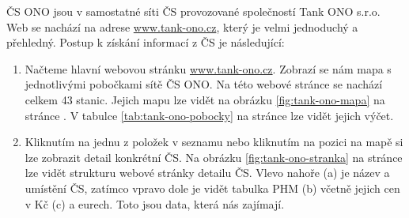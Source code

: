 ČS ONO jsou v samostatné síti ČS provozované společností Tank ONO s.r.o.
Web se nachází na adrese \url{www.tank-ono.cz}, který je velmi jednoduchý
a přehledný. Postup k získání informací z ČS je následující:

\begin{enumerate}
    \item Načteme hlavní webovou stránku \url{www.tank-ono.cz}. Zobrazí
        se nám mapa s jednotlivými pobočkami sítě ČS ONO. Na této webové
        stránce se nachází celkem 43 stanic. Jejich mapu lze vidět
        na obrázku \ref{fig:tank-ono-mapa} na stránce
        \pageref{fig:tank-ono-mapa}. V tabulce \ref{tab:tank-ono-pobocky}
        na stránce \pageref{tab:tank-ono-pobocky} lze vidět jejich výčet.
    \item Kliknutím na jednu z položek v seznamu nebo kliknutím na pozici
        na mapě si lze zobrazit detail konkrétní ČS. Na obrázku
        \ref{fig:tank-ono-stranka} na stránce \pageref{fig:tank-ono-stranka}
        lze vidět strukturu webové stránky detailu ČS. Vlevo nahoře (a) je název
        a umístění ČS, zatímco vpravo dole je vidět tabulka PHM (b) včetně jejich
        cen v Kč (c) a eurech. Toto jsou data, která nás zajímají.
\end{enumerate}

